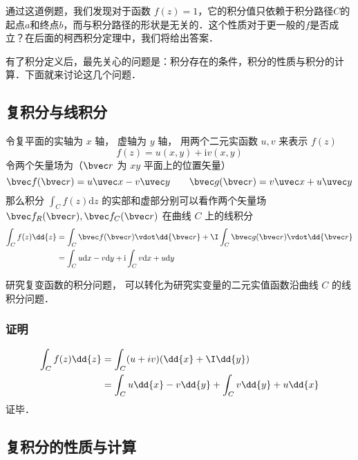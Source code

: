 通过这道例题，我们发现对于函数 $f(z)=1$，它的积分值只依赖于积分路径$C$的起点$a$和终点$b$，而与积分路径的形状是无关的．这个性质对于更一般的$f$是否成立？在后面的柯西积分定理中，我们将给出答案．

有了积分定义后，最先关心的问题是：积分存在的条件，积分的性质与积分的计算．下面就来讨论这几个问题．

\subsection{复积分与线积分}
\begin{theorem}{}
令复平面的实轴为 $x$ 轴， 虚轴为 $y$ 轴， 用两个二元实函数 $u, v$ 来表示 $f(z)$
\begin{equation}
f (z) = u(x, y) + \mathrm iv(x, y)
\end{equation}
令两个矢量场为（$\bvec r$ 为 $xy$ 平面上的位置矢量）
\begin{equation}
\bvec f(\bvec r) = u\uvec x - v\uvec y
\qquad
\bvec g(\bvec r) = v\uvec x + u\uvec y
\end{equation}
那么积分 $\int_{C} f(z) \mathrm{d} z$ 的实部和虚部分别可以看作两个矢量场 $\bvec f_R(\bvec r), \bvec f_C(\bvec r)$ 在曲线 $C$ 上的线积分
\begin{equation}
\begin{aligned}
\int_{C} f(z) \dd{z} &= \int_C \bvec f(\bvec r) \vdot \dd{\bvec r} + \I \int_C \bvec g(\bvec r) \vdot \dd{\bvec r}\\
&= \int_{C} u \mathrm{d} x-v \mathrm{d} y+\mathrm{i} \int_{C} v \mathrm{d} x+u \mathrm{d} y
\end{aligned}
\end{equation}
\end{theorem}
研究复变函数的积分问题， 可以转化为研究实变量的二元实值函数沿曲线 $C$ 的线积分问题．

\subsubsection{证明}
\begin{equation}
\begin{aligned}
\int_C f(z) \dd{z} &= \int_C (u+iv)(\dd{x} + \I \dd{y})\\
&= \int_C u\dd{x} - v\dd{y} + \int_C v\dd{y} + u\dd{x}
\end{aligned}
\end{equation}
证毕．

\subsection{复积分的性质与计算}

